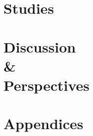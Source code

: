 \documentclass[a4paper,oneside,nobind]{thesis}
\newcommand\myemptypage{
    \begin{alwayssingle}
    \thispagestyle{empty}
    \vspace*{\fill}
    \addtocounter{page}{-1}
    \end{alwayssingle}
    }
\begin{document}
    \part{Studies}\titlepagedecoration
    \label{part:studies}
    
    
    
    
    
    
    \part[Discussion \& Perspectives]{Discussion\\ \vspace{10pt} \&\\ \vspace{10pt} Perspectives}\titlepagedecoration
    \label{chap:conclusion}
    
    

    
    \cleardoublepage{}
    \startappendices
    \part*{Appendices}\titlepagedecoration
    \thispagestyle{empty}

    
    \adjustmtc[0]
    
    
    
    
    
    
    
    
    \myemptypage
    
    
    
\end{document}
